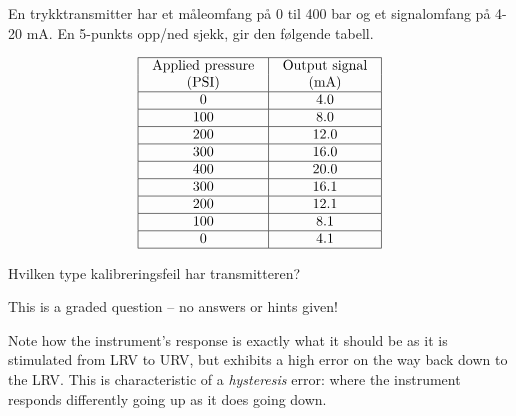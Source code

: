 


En trykktransmitter har et måleomfang på 0 til 400 bar og et signalomfang på 4-20 mA. En 5-punkts opp/ned sjekk, gir den følgende tabell. 


$$\vbox{\offinterlineskip
\halign{\strut
\vrule \quad\hfil # \ \hfil & 
\vrule \quad\hfil # \ \hfil \vrule \cr
\noalign{\hrule}
%
Applied pressure & Output signal \cr
%
(PSI) & (mA) \cr
%
\noalign{\hrule}
%
0 & 4.0 \cr
%
\noalign{\hrule}
%
100 & 8.0 \cr
%
\noalign{\hrule}
%
200 & 12.0 \cr
%
\noalign{\hrule}
%
300 & 16.0 \cr
%
\noalign{\hrule}
%
400 & 20.0 \cr
%
\noalign{\hrule}
%
300 & 16.1 \cr
%
\noalign{\hrule}
%
200 & 12.1 \cr
%
\noalign{\hrule}
%
100 & 8.1 \cr
%
\noalign{\hrule}
%
0 & 4.1 \cr
%
\noalign{\hrule}
} %
}$$ %

\vskip 10pt

Hvilken type kalibreringsfeil har transmitteren?

\vfil 

\eject






This is a graded question -- no answers or hints given!







Note how the instrument's response is exactly what it should be as it is stimulated from LRV to URV, but exhibits a high error on the way back down to the LRV.  This is characteristic of a {\it hysteresis} error: where the instrument responds differently going up as it does going down.




